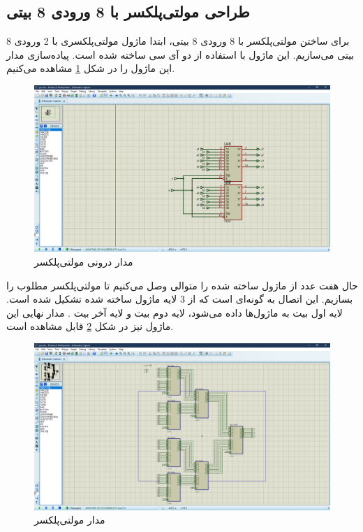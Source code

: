 \documentclass[fleqn]{article}
\begin{document}
\subsection{طراحی مولتی‌پلکسر با 8 ورودی 8 بیتی}

برای ساختن مولتی‌پلکسر با 8 ورودی 8 بیتی، ابتدا ماژول مولتی‌پلکسری با 2 ورودی 8 بیتی می‌سازیم. 
این ماژول با استفاده از دو آی سی 
ساخته شده است. پیاده‌سازی مدار این ماژول را در شکل 
\ref{mux_inner}
مشاهده می‌کنیم. 

\begin{figure}[!htbp]
  \includegraphics[width=\textwidth]{Assets/mux_inner.png}
  \caption{مدار درونی مولتی‌پلکسر}
  \label{mux_inner}
\end{figure}

حال هفت عدد از ماژول ساخته شده را متوالی وصل می‌کنیم تا مولتی‌پلکسر مطلوب را بسازیم. این اتصال به گونه‌ای است 
که از 3 لایه ماژول ساخته شده تشکیل شده است. لایه اول بیت 
به ماژول‌ها داده می‌شود، 
لایه دوم بیت 
و لایه آخر بیت 
. 
مدار نهایی این ماژول نیز در شکل 
\ref{mux}
قابل مشاهده است. 

\begin{figure}[!htbp]
  \includegraphics[width=\textwidth]{Assets/mux.png}
  \caption{مدار مولتی‌پلکسر}
  \label{mux}
\end{figure}
\end{document}
